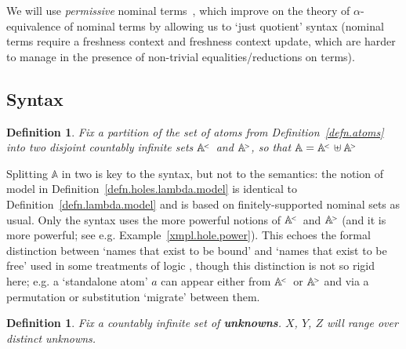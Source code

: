 \documentclass[submission,copyright]{eptcs}
\newtheorem{defn}[thrm]{Definition}
\newcommand{\deffont}[1]{\textbf{#1}}
\newcommand\atomsdown{\mathbb A^{\hspace{-.3ex}{}_{{}^<}}}
\newcommand\atomsup{\mathbb A^{\hspace{-.3ex}{}_{{}^>}\!}} \newcommand\basesort{\tau}
\begin{document}
We will use \emph{permissive} nominal terms~\cite{gabbay:perntu-jv}, which improve on the theory of $\alpha$-equivalence of nominal terms by allowing us to `just quotient' syntax (nominal terms require a freshness context and freshness context update, which are harder to manage in the presence of non-trivial equalities/reductions on terms). 
\subsection{Syntax}
\label{subsect.syntax} 

\begin{defn}
\label{defn.partition}
Fix a partition of the set of atoms from Definition~\ref{defn.atoms} into two disjoint countably infinite sets $\atomsdown$ and $\atomsup$, so that $\mathbb A=\atomsdown\uplus\atomsup$ 
\end{defn}

Splitting $\mathbb A$ in two is key to the syntax, but not to the semantics: the notion of model in Definition~\ref{defn.holes.lambda.model} is identical to Definition~\ref{defn.lambda.model} and is based on finitely-supported nominal sets as usual.
Only the syntax uses the more powerful notions of $\atomsdown$ and $\atomsup$ (and it is more powerful; see e.g. Example~\ref{xmpl.hole.power}).
This echoes the formal distinction between `names that exist to be bound' and `names that exist to be free' used in some treatments of logic \cite{heijenoort:fregsb,smullyan:firol}, though this distinction is not so rigid here; e.g. a `standalone atom' $a$ can appear either from $\atomsdown$ or $\atomsup$ and via a permutation or substitution `migrate' between them.





\begin{defn}
Fix a countably infinite set of \deffont{unknowns}.
$X$, $Y$, $Z$ will range over distinct unknowns.
\end{defn}
\end{document}
